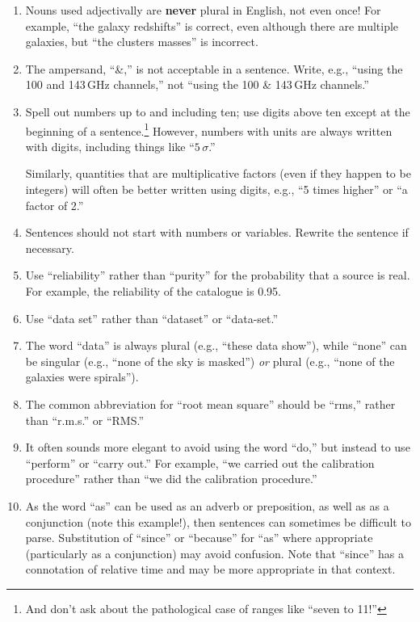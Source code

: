 \documentclass[letterpaper,11pt]{article}
\begin{document}
\begin{enumerate}
\item
Nouns used adjectivally are {\bf never\/} plural in English, not even once!
For example, ``the galaxy redshifts'' is correct, even although there are
multiple galaxies, but ``the clusters masses'' is incorrect.

\item The ampersand, ``\&,'' is not acceptable in a sentence.  Write, e.g.,
``using the 100 and 143$\,$GHz channels,'' not ``using the 100 \& 143$\,$GHz
channels.''

\item Spell out numbers up to and including ten; use digits above ten except at
the beginning of a sentence.\footnote{And don't ask about the
pathological case of ranges like ``seven to 11!''}  However, numbers with units are always written with
digits, including things like ``$5\,\sigma$.''

Similarly, quantities that are multiplicative factors (even if they happen to
be integers) will often be better written using digits, e.g., ``5 times
higher'' or ``a factor of 2.''

\item
Sentences should not start with numbers or variables.  Rewrite the sentence
if necessary.

\item Use ``reliability'' rather than ``purity'' for the probability that a
source is real.  For example, the reliability of the catalogue is 0.95.

\item
Use ``data set'' rather than ``dataset'' or ``data-set.''

\item
The word ``data'' is always plural (e.g., ``these data show''), while ``none''
can be singular (e.g., ``none of the sky is masked'') {\it or\/} plural
(e.g., ``none of the galaxies were spirals'').

\item
The common abbreviation for ``root mean square'' should be ``rms,'' rather than
``r.m.s.'' or ``RMS.''

\item
It often sounds more elegant to avoid using the word ``do,'' but instead to
use ``perform'' or ``carry out.''  For example, ``we carried out the
calibration procedure'' rather than ``we did the calibration procedure.''

\item
As the word ``as'' can be used as an adverb or preposition, as well as as a
conjunction (note this example!), then sentences can sometimes be difficult
to parse.  Substitution of ``since'' or ``because'' for ``as'' where
appropriate (particularly as a conjunction) may avoid confusion.  Note that ``since'' has a connotation
of relative time and may be more appropriate in that context.


\end{enumerate}
\end{document}
